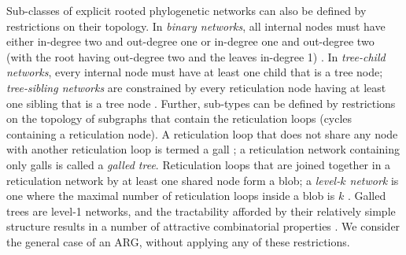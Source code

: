 \documentclass{article}
\begin{document}
Sub-classes of explicit rooted phylogenetic networks can also be defined by restrictions on their topology.
In \emph{binary networks}, all internal nodes must have either in-degree two and out-degree one or in-degree
one and out-degree two (with the root having out-degree two and the leaves in-degree 1) \citep{steel2016phylogeny}.
In \emph{tree-child networks}, every internal node must have at least one child that is a tree node;
\emph{tree-sibling networks} are constrained by every reticulation node having at least one sibling that is a
tree node \citep{cardona2008extended}. Further, sub-types can be defined by restrictions on
the topology of subgraphs that contain the reticulation loops (cycles containing a reticulation node).
A reticulation loop that does not share any node with another reticulation loop is termed a gall
\citep[][p.\ 237]{gusfield2014recombinatorics}; a reticulation network containing only galls is
called a \emph{galled tree}. Reticulation loops that are joined together in a reticulation network
by at least one shared node form a blob; a \emph{level-$k$ network} is one where the maximal number
of reticulation loops inside a blob is $k$ \citep{choy2005computing}. Galled trees are level-1 networks,
and the tractability afforded by their relatively simple structure results in a number of attractive
combinatorial properties \citep{wang2001perfect, gusfield2004optimal}. We consider the general case of
an ARG, without applying any of these restrictions.

\end{document}
